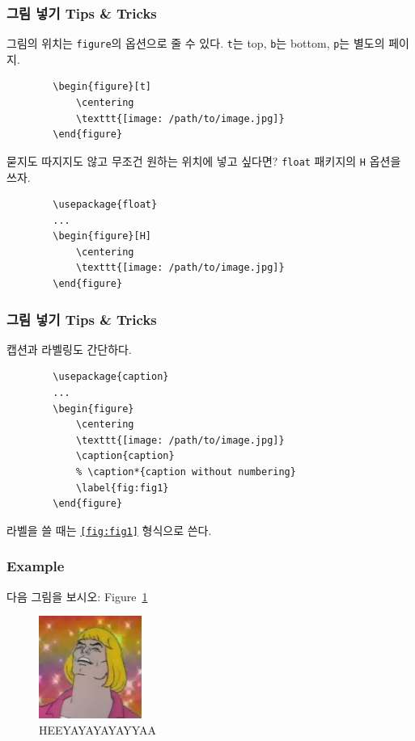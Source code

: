 \documentclass[aspectratio={169}]{beamer}
\begin{document}
\begin{frame}[fragile]
    \frametitle{그림 넣기 Tips \& Tricks}

    그림의 위치는 \texttt{figure}의 옵션으로 줄 수 있다. \texttt{t}는 top, \texttt{b}는 bottom, \texttt{p}는 별도의 페이지.
    \begin{verbatim}
        \begin{figure}[t]
            \centering
            \texttt{[image: /path/to/image.jpg]}
        \end{figure}
    \end{verbatim}

    묻지도 따지지도 않고 무조건 원하는 위치에 넣고 싶다면? \texttt{float} 패키지의 \texttt{H} 옵션을 쓰자.
    \begin{verbatim}
        \usepackage{float}
        ...
        \begin{figure}[H]
            \centering
            \texttt{[image: /path/to/image.jpg]}
        \end{figure}
    \end{verbatim}

\end{frame}

\begin{frame}[fragile]
    \frametitle{그림 넣기 Tips \& Tricks}

    캡션과 라벨링도 간단하다.
    \begin{verbatim}
        \usepackage{caption}
        ...
        \begin{figure}
            \centering
            \texttt{[image: /path/to/image.jpg]}
            \caption{caption}
            % \caption*{caption without numbering}
            \label{fig:fig1}
        \end{figure}
    \end{verbatim}
    라벨을 쓸 때는 \texttt{\ref{fig:fig1}} 형식으로 쓴다.

\end{frame}

\begin{frame}
    \frametitle{Example}

    다음 그림을 보시오: Figure~\ref{fig:heeman}

    \begin{figure}
        \centering
        \includegraphics[width=0.3\textwidth]{heeman.jpg}
        \caption{HEEYAYAYAYAYYAA}
        \label{fig:heeman}
    \end{figure}

\end{frame}
\end{document}
